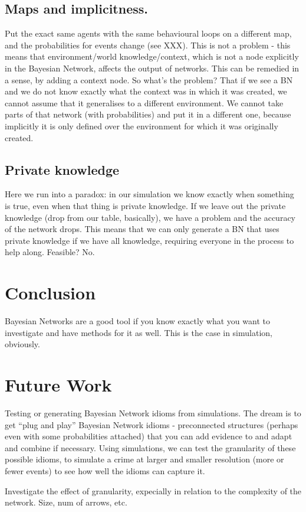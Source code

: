 \subsection{Maps and implicitness.}

Put the exact same agents with the same behavioural loops on a different map, and the probabilities for events change (see XXX). This is not a problem - this means that environment/world knowledge/context, which is not a node explicitly in the Bayesian Network, affects the output of networks. This can be remedied in a sense, by adding a context node. So what's the problem? That if we see a BN and we do not know exactly what the context was in which it was created, we cannot assume that it generalises to a different environment. We cannot take parts of that network (with probabilities) and put it in a different one, because implicitly it is only defined over the environment for which it was originally created.

\subsection{Private knowledge}

Here we run into a paradox: in our simulation we know exactly when something is true, even when that thing is private knowledge. If we leave out the private knowledge (drop from our table, basically), we have a problem and the accuracy of the network drops. This means that we can only generate a BN that uses private knowledge if we have all knowledge, requiring everyone in the process to help along. Feasible? No.


\section{Conclusion}
Bayesian Networks are a good tool if you know exactly what you want to investigate and have methods for it as well. This is the case in simulation, obviously.


\section{Future Work}
Testing or generating Bayesian Network idioms from simulations. The dream is to get ``plug and play'' Bayesian Network idioms - preconnected structures (perhaps even with some probabilities attached) that you can add evidence to and adapt and combine if necessary. Using simulations, we can test the granularity of these possible idioms, to simulate a crime at larger and smaller resolution (more or fewer events) to see how well the idioms can capture it.

Investigate the effect of granularity, expecially in relation to the complexity of the network. Size, num of arrows, etc. 